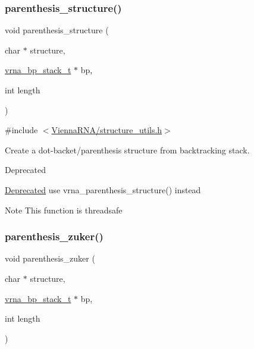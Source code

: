 \subsubsection{\texorpdfstring{parenthesis\+\_\+structure()}{parenthesis\_structure()}}
{\footnotesize\ttfamily void parenthesis\+\_\+structure (\begin{DoxyParamCaption}\item[{char $\ast$}]{structure,  }\item[{\hyperlink{group__data__structures_gaa651bda42e7692f08cb603cd6834b0ee}{vrna\+\_\+bp\+\_\+stack\+\_\+t} $\ast$}]{bp,  }\item[{int}]{length }\end{DoxyParamCaption})}



{\ttfamily \#include $<$\hyperlink{structure__utils_8h}{Vienna\+R\+N\+A/structure\+\_\+utils.\+h}$>$}



Create a dot-\/backet/parenthesis structure from backtracking stack. 

\begin{DoxyRefDesc}{Deprecated}
\item[\hyperlink{deprecated__deprecated000147}{Deprecated}]use vrna\+\_\+parenthesis\+\_\+structure() instead\end{DoxyRefDesc}


\begin{DoxyNote}{Note}
This function is threadsafe 
\end{DoxyNote}
\mbox{\label{group__struct__utils_gab9c5c8311bd5120900585d4fa50c2df0}} 
\subsubsection{\texorpdfstring{parenthesis\+\_\+zuker()}{parenthesis\_zuker()}}
{\footnotesize\ttfamily void parenthesis\+\_\+zuker (\begin{DoxyParamCaption}\item[{char $\ast$}]{structure,  }\item[{\hyperlink{group__data__structures_gaa651bda42e7692f08cb603cd6834b0ee}{vrna\+\_\+bp\+\_\+stack\+\_\+t} $\ast$}]{bp,  }\item[{int}]{length }\end{DoxyParamCaption})}



